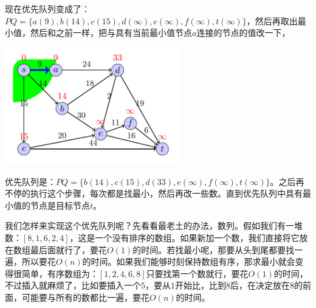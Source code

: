   	现在优先队列变成了：$PQ=\{a(9), b(14), c(15), d(\infty), e(\infty), f(\infty), t(\infty) \}$，然后再取出最小值，然后和之前一样，把与具有当前最小值节点$a$连接的节点的值改一下，
  	\begin{center}
  		\includegraphics[width=3in]{Dijkstra_demo_2.png}
  	\end{center}
  	优先队列是：$PQ=\{ b(14), c(15), d(33), e(\infty), f(\infty), t(\infty) \}$。之后再不停的执行这个步骤，每次都是找最小，然后再改一些数。直到优先队列中具有最小值的节点是目标节点$t$。
  	
  	我们怎样来实现这个优先队列呢？先看看最老土的办法，数列。假如我们有一堆数：$[8,1,6,2,4]$，这是一个没有排序的数组。如果新加一个数，我们直接将它放在数组最后面就行了，要花$O(1)$的时间。若找最小呢，那要从头到尾都要找一遍，所以要花$O(n)$的时间。如果我们能够时刻保持数组有序，那求最小就会变得很简单，有序数组为：$[1,2,4,6,8]$只要找第一个数就行，要花$O(1)$的时间，不过插入就麻烦了，比如要插入一个$5$，要从$1$开始比，比到$8$后，在决定放在$8$的前面，可能要与所有的数都比一遍，要花$O(n)$的时间。
  	
